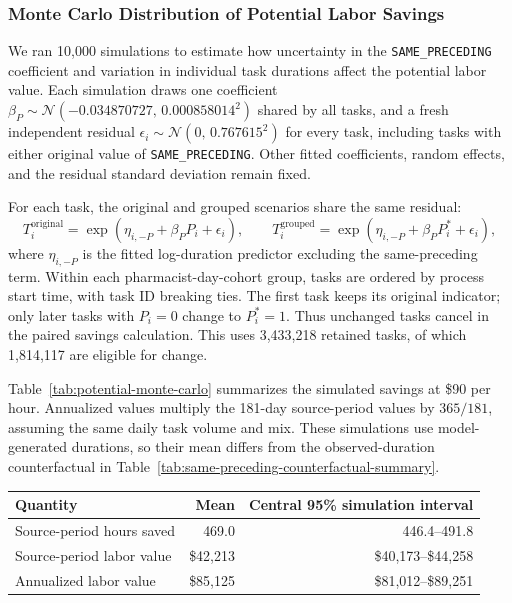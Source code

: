 \subsubsection{Monte Carlo Distribution of Potential Labor Savings}
\label{sec:potential-monte-carlo}
We ran 10,000 simulations to estimate how uncertainty in the
\texttt{SAME\_PRECEDING} coefficient and variation in individual task durations
 affect the potential labor value. Each simulation draws one coefficient
$\beta_P \sim \mathcal{N}(-0.034870727,\,0.000858014^2)$ shared by all tasks,
and a fresh independent residual $\epsilon_i \sim \mathcal{N}(0,\,0.767615^2)$
for every task, including tasks with either original value of
\texttt{SAME\_PRECEDING}. Other fitted coefficients, random effects, and the
residual standard deviation remain fixed.

For each task, the original and grouped scenarios share the same residual:
\[
 T_i^{\mathrm{original}}=\exp(\eta_{i,-P}+\beta_P P_i+\epsilon_i),
 \qquad
 T_i^{\mathrm{grouped}}=\exp(\eta_{i,-P}+\beta_P P_i^*+\epsilon_i),
\]
where $\eta_{i,-P}$ is the fitted log-duration predictor excluding the
same-preceding term. Within each pharmacist-day-cohort group, tasks are ordered
by process start time, with task ID breaking ties. The first task keeps its
original indicator; only later tasks with $P_i=0$ change to $P_i^*=1$.
Thus unchanged tasks cancel in the paired savings calculation. This uses
3,433,218 retained tasks, of which 1,814,117 are eligible for change.

Table~\ref{tab:potential-monte-carlo} summarizes the simulated savings at
\$90 per hour. Annualized values multiply the 181-day source-period values by
$365/181$, assuming the same daily task volume and mix. These simulations
use model-generated durations, so their mean differs from the observed-duration
counterfactual in Table~\ref{tab:same-preceding-counterfactual-summary}.

\begin{center}
\begin{tabular}{@{}lrr@{}}
\toprule
Quantity & Mean & Central 95\% simulation interval \\
\midrule
Source-period hours saved & 469.0 & 446.4--491.8 \\
Source-period labor value & \$42,213 & \$40,173--\$44,258 \\
Annualized labor value & \$85,125 & \$81,012--\$89,251 \\
\bottomrule
\end{tabular}
\label{tab:potential-monte-carlo}
\end{center}


